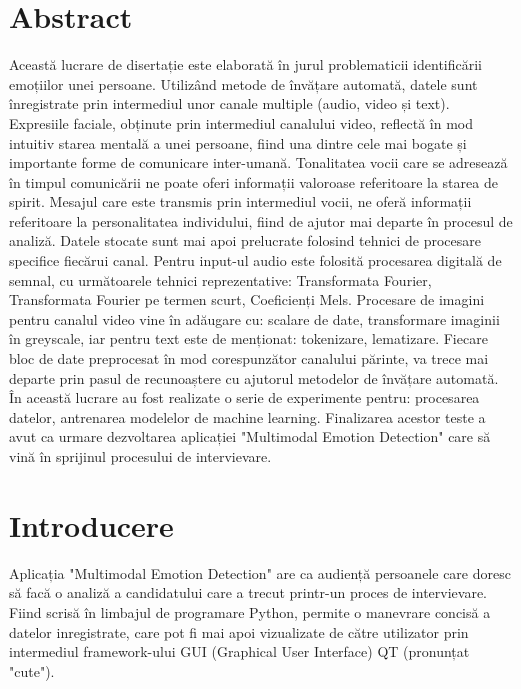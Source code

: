 \documentclass[a4paper, 12pt]{report}
\begin{document}
	
	
	
	\newpage
	\tableofcontents
	\newpage
	\section{Abstract}	
	Această lucrare de disertație este elaborată în jurul problematicii identificării emoțiilor unei persoane. Utilizând metode de învățare automată, datele sunt înregistrate prin intermediul unor canale multiple (audio, video și text). Expresiile faciale, obținute prin intermediul canalului video, reflectă în mod intuitiv starea mentală a unei persoane, fiind una dintre cele mai bogate și importante forme de comunicare inter-umană. Tonalitatea vocii care se adresează în timpul comunicării ne poate oferi informații valoroase referitoare la starea de spirit. Mesajul care este transmis prin intermediul vocii, ne oferă informații referitoare la personalitatea individului, fiind de ajutor mai departe în procesul de analiză.
	Datele stocate sunt mai apoi prelucrate folosind tehnici de procesare specifice fiecărui canal. Pentru input-ul audio este folosită procesarea digitală de semnal, cu următoarele tehnici reprezentative: Transformata Fourier, Transformata Fourier pe termen scurt, Coeficienți Mels. Procesare de imagini pentru canalul video vine în adăugare cu: scalare de date, transformare imaginii în greyscale, iar pentru text este de menționat: tokenizare, lematizare. Fiecare bloc de date preprocesat în mod corespunzător canalului părinte, va trece mai departe prin pasul de recunoaștere cu ajutorul metodelor de învățare automată.
	În această lucrare au fost realizate o serie de experimente pentru: procesarea datelor, antrenarea modelelor de machine learning. Finalizarea acestor teste a avut ca urmare dezvoltarea aplicației "Multimodal Emotion Detection" care să vină în sprijinul procesului de intervievare.
	\clearpage
	
	\section{Introducere}
	Aplicația "Multimodal Emotion Detection" are ca audiență persoanele care doresc să facă o analiză a candidatului care a trecut printr-un proces de intervievare. Fiind scrisă în limbajul de programare Python, permite o manevrare concisă a datelor inregistrate, care pot fi mai apoi vizualizate de către utilizator prin intermediul framework-ului GUI (Graphical User Interface) QT (pronunțat "cute"). 
	
\end{document}
